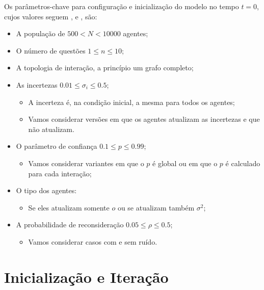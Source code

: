 Os parâmetros-chave para configuração e inicialização do modelo no tempo \(t =
0\), cujos valores seguem ,
 e , são:
\begin{itemize}
\item A população de \(500 < N < 10000\) agentes;
\item O número de questões \(1 \leq n \leq 10\); 

\item A topologia de interação, a princípio um grafo completo;  

\item As incertezas \(0.01 \leq \sigma_i \leq 0.5\);
  \begin{itemize}
  \item A incerteza é, na condição inicial, a mesma para todos os agentes;
  \item Vamos considerar versões em que os agentes atualizam as incertezas e que
    não atualizam.
  \end{itemize}

\item O parâmetro de confiança \(0.1 \leq p \leq 0.99\);
  
  \begin{itemize}
  \item Vamos considerar variantes em que o \(p\) é global ou em que o \(p\) é
    calculado para cada interação;
  \end{itemize}


\item O tipo dos agentes:
  \begin{itemize}
  \item Se eles atualizam somente \(o\) ou se atualizam também \(\sigma^2\);
  \end{itemize}


\item A probabilidade de reconsideração \(0.05 \leq \rho  \leq 0.5\);

  \begin{itemize}
  \item Vamos considerar casos com e sem ruído.
  \end{itemize}
  
\end{itemize}

\section{Inicialização e Iteração}

